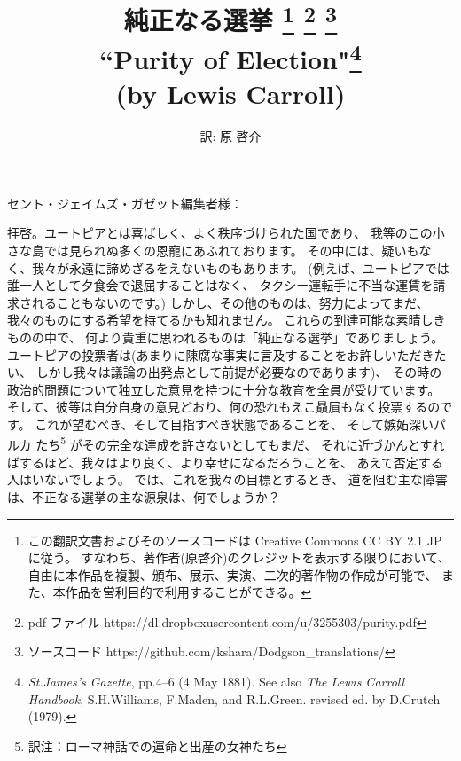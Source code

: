 \documentclass{article}
\title{純正なる選挙
    \footnote{この翻訳文書およびそのソースコードは
    Creative Commons CC BY 2.1 JP に従う。
    すなわち、著作者(原啓介)のクレジットを表示する限りにおいて、
    自由に本作品を複製、頒布、展示、実演、二次的著作物の作成が可能で、
    また、本作品を営利目的で利用することができる。}
    \footnote{pdf ファイル https://dl.dropboxusercontent.com/u/3255303/purity.pdf}
    \footnote{ソースコード https://github.com/kshara/Dodgson\_translations/}
    \\
    \medskip
    {\large
        ``Purity of Election"\footnote{
            {\it St.James's Gazette}, pp.4--6 (4 May 1881).
            See also {\it The Lewis Carroll Handbook},
            S.H.Williams, F.Maden, and R.L.Green.
            revised ed. by D.Crutch (1979).
            }
     \\
    (by Lewis Carroll)
    }
}
\author{訳: 原 啓介}
\begin{document}
\maketitle


\section*{}

セント・ジェイムズ・ガゼット編集者様：

\bigskip

 拝啓。ユートピアとは喜ばしく、よく秩序づけられた国であり、
我等のこの小さな島では見られぬ多くの恩寵にあふれております。
その中には、疑いもなく、我々が永遠に諦めざるをえないものもあります。
(例えば、ユートピアでは誰一人として夕食会で退屈することはなく、
タクシー運転手に不当な運賃を請求されることもないのです。)
しかし、その他のものは、努力によってまだ、
我々のものにする希望を持てるかも知れません。
これらの到達可能な素晴しきものの中で、
何より貴重に思われるものは「純正なる選挙」でありましょう。
ユートピアの投票者は(あまりに陳腐な事実に言及することをお許しいただきたい、
しかし我々は議論の出発点として前提が必要なのであります)、
その時の政治的問題について独立した意見を持つに十分な教育を全員が受けています。
そして、彼等は自分自身の意見どおり、何の恐れもえこ贔屓もなく投票するのです。
これが望むべき、そして目指すべき状態であることを、
そして嫉妬深いパルカ
たち\footnote{訳注：ローマ神話での運命と出産の女神たち}
がその完全な達成を許さないとしてもまだ、
それに近づかんとすればするほど、我々はより良く、より幸せになるだろうことを、
あえて否定する人はいないでしょう。
では、これを我々の目標とするとき、
道を阻む主な障害は、不正なる選挙の主な源泉は、何でしょうか？

\medskip
\end{document}
